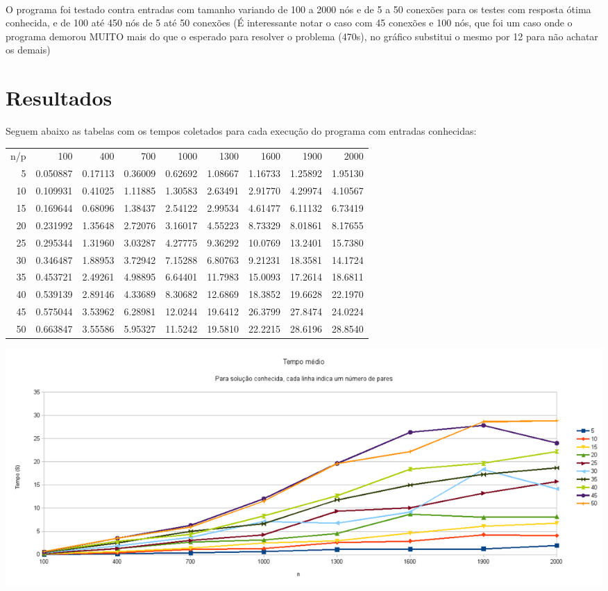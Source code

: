 \documentclass{article}
\begin{document}
\paragraph{} O programa foi testado contra entradas com tamanho
variando de 100 a 2000 nós e de 5 a 50 conexões para os testes com
resposta ótima conhecida, e de 100 até 450 nós de 5 até 50 conexões
(É interessante notar o caso com 45 conexões e 100 nós, que foi um
caso onde o programa demorou MUITO mais do que o esperado para
resolver o problema (470s), no gráfico substitui o mesmo por 12 para
não achatar os demais)


\section*{Resultados} Seguem abaixo as tabelas com os tempos coletados
para cada execução do programa com entradas conhecidas:
\begin{center}
\begin{tabular}{rrrrrrrrr}
n/p & 100 & 400 & 700 & 1000 & 1300 & 1600 & 1900 & 2000\\
5 & 0.050887 & 0.17113 & 0.36009 & 0.62692 & 1.08667 & 1.16733 & 1.25892 & 1.95130\\
10 & 0.109931 & 0.41025 & 1.11885 & 1.30583 & 2.63491 & 2.91770 & 4.29974 & 4.10567\\
15 & 0.169644 & 0.68096 & 1.38437 & 2.54122 & 2.99534 & 4.61477 & 6.11132 & 6.73419\\
20 & 0.231992 & 1.35648 & 2.72076 & 3.16017 & 4.55223 & 8.73329 & 8.01861 & 8.17655\\
25 & 0.295344 & 1.31960 & 3.03287 & 4.27775 & 9.36292 & 10.0769 & 13.2401 & 15.7380\\
30 & 0.346487 & 1.88953 & 3.72942 & 7.15288 & 6.80763 & 9.21231 & 18.3581 & 14.1724\\
35 & 0.453721 & 2.49261 & 4.98895 & 6.64401 & 11.7983 & 15.0093 & 17.2614 & 18.6811\\
40 & 0.539139 & 2.89146 & 4.33689 & 8.30682 & 12.6869 & 18.3852 & 19.6628 & 22.1970\\
45 & 0.575044 & 3.53962 & 6.28981 & 12.0244 & 19.6412 & 26.3799 & 27.8474 & 24.0224\\
50 & 0.663847 & 3.55586 & 5.95327 & 11.5242 & 19.5810 & 22.2215 & 28.6196 & 28.8540\\
\end{tabular}
\end{center}
\includegraphics[scale=0.4]{graphic_know}
\end{document}
